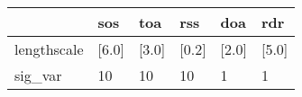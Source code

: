 \begin{tabular}{llllll}
\toprule
{} &    sos &    toa &    rss &    doa &    rdr \\
\midrule
lengthscale &  [6.0] &  [3.0] &  [0.2] &  [2.0] &  [5.0] \\
sig\_var     &     10 &     10 &     10 &      1 &      1 \\
\bottomrule
\end{tabular}
